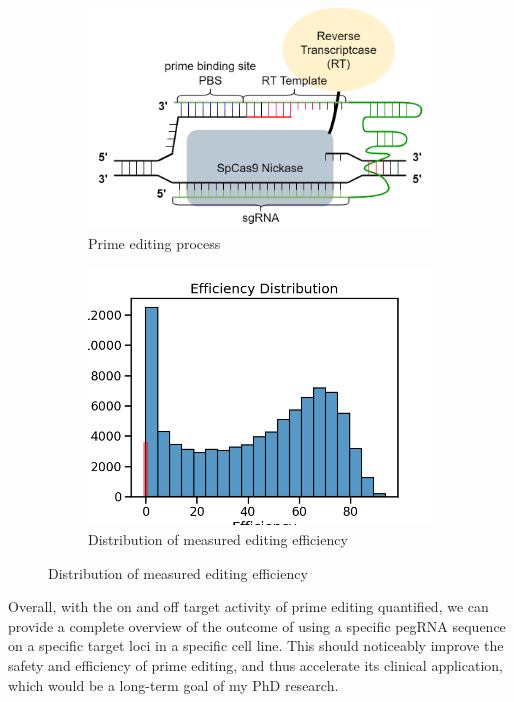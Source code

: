 \documentclass[a4,12pt]{article}
\begin{document}
\begin{figure}
    \centering
    \begin{subfigure}{0.4\textwidth}
        \includegraphics[width=\textwidth]{prime-editing-process.png}
        \caption{Prime editing process}
        \label{fig:prime-editing-process}
    \end{subfigure}
    \begin{subfigure}{0.3\textwidth}
        \includegraphics[width=\textwidth]{efficiency_distribution.png}
        \caption{Distribution of measured editing efficiency}
    \end{subfigure}
\end{figure}

Overall, with the on and off target activity of prime editing quantified, we can provide a complete overview of the outcome of using a specific pegRNA sequence on a specific target loci in a specific cell line. This should noticeably improve the safety and efficiency of prime editing, and thus accelerate its clinical application, which would be a long-term goal of my PhD research. 
\end{document}
